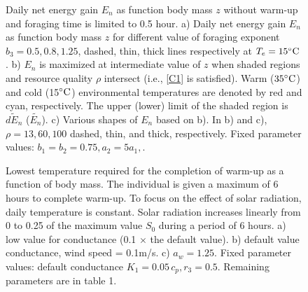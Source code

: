 \newpage
%
\begin{figure}[H]
\begin{center}
\caption{
	 Daily net energy gain  $E_n$ as function body mass $z$ without warm-up and foraging time is limited to 0.5 hour.
	a) Daily net energy gain  $E_n$ as function body mass $z$ for different value of foraging exponent $b_3 = 0.5, 0.8, 1.25$, dashed, thin, thick lines respectively  at $T_e  = 15 ^{\circ} \rm{C}$.
	b) $E_n$ is maximized at intermediate value of $z$  when shaded regions and resource quality $\rho$ intersect (i.e., \cref{C1} is satisfied).
	Warm ($35^{\circ} \rm{C}$) and cold (15$^{\circ} \rm{C}$) environmental temperatures are denoted by red and cyan, respectively.
	The upper (lower) limit of the shaded region is $\widetilde{dE_n}$ ($\widetilde{E_n}$).  
	c) Various shapes of $E_n$ based on b).
	In b) and c), $\rho = 13, 60, 100$ dashed, thin, and thick, respectively.
	Fixed parameter values: $b_1 = b_2 = 0.75, a_2 = 5 a_1, $.
}
\label{fig3}
\end{center}
\end{figure}
%
\begin{figure}[H]
\begin{center}
\caption{
	Lowest temperature required for the completion of warm-up as a function of body mass.
	The individual is given a maximum of 6 hours to complete warm-up.
	To focus on the effect of solar radiation, daily temperature is constant.
	Solar radiation increases linearly from 0 to 0.25 of the maximum value $S_0$ during a period of 6 hours. 
	a)  low value for conductance (0.1 $\times$ the default value).
	b) default value conductance, wind speed  = 0.1m/s.
	c)  $a_w = 1.25$. 
	Fixed parameter values: default conductance $K_1 = 0.05 \, c_p, r_3 = 0.5$.
	Remaining parameters are in table 1.
}%
\label{fig4}
\end{center}
\end{figure}

